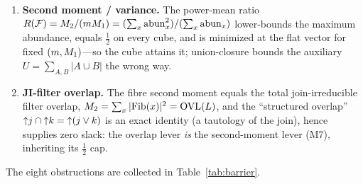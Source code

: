 \documentclass[11pt]{amsart}
\theoremstyle{definition}
\theoremstyle{remark}
\begin{document}
\begin{enumerate}[label=\textbf{M\arabic*.},leftmargin=2.6em,itemsep=3pt]
in multiplier form; it certifies the \emph{mean} abundance $\Mone/(nm)$ and
degenerates on the cube ($\overline s/n=\tfrac12$, Reimer tight, zero margin). The
residual gap is exactly max-versus-mean.
\item \textbf{Second moment / variance.} The power-mean ratio
$R(\mathcal{F})=M_2/(mM_1)=(\sum_x\operatorname{abun}_x^2)/(\sum_x\operatorname{abun}_x)$ lower-bounds the maximum
abundance, equals $\tfrac12$ on every cube, and is minimized at the flat vector for
fixed $(m,M_1)$---so the cube attains it; union-closure bounds the auxiliary
$U=\sum_{A,B}|A\cup B|$ the wrong way.
\item \textbf{JI-filter overlap.} The fibre second moment equals the total
join-irreducible filter overlap, $M_2=\sum_x|\mathrm{Fib}(x)|^2=\mathrm{OVL}(L)$, and the
``structured overlap'' ${\uparrow}j\cap{\uparrow}k={\uparrow}(j\vee k)$ is an exact identity
(a tautology of the join), hence supplies zero slack: the overlap lever
\emph{is} the second-moment lever (M7), inheriting its $\tfrac12$ cap.
\end{enumerate}

The eight obstructions are collected in Table~\ref{tab:barrier}.
\end{document}
